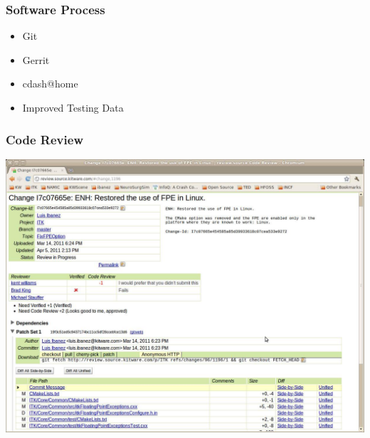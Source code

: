 





{
\begin{frame}
\frametitle{Software Process}
\Huge
\begin{itemize}
\item Git
\pause
\item Gerrit
\pause
\item cdash@home
\pause
\item Improved Testing Data
\end{itemize}
\end{frame}
}


{
\begin{frame}
  \frametitle{Code Review}
  \includegraphics[width=\textwidth,height=\paperheight]{../Art/ITKGerritScreenShot.jpg}
\end{frame}
}


